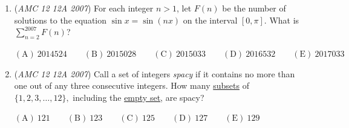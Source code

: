 \begin{enumerate}
	\item (\textit{AMC 12 12A 2007}) For each integer $n>1$, let $F(n)$ be the number of solutions to the equation $\sin{x}=\sin{(nx)}$ on the interval $[0,\pi]$. What is $\sum_{n=2}^{2007} F(n)$?


 $\mathrm{(A)}\ 2014524 \qquad \mathrm{(B)}\ 2015028 \qquad \mathrm{(C)}\ 2015033 \qquad \mathrm{(D)}\ 2016532 \qquad \mathrm{(E)}\ 2017033$


	\item (\textit{AMC 12 12A 2007}) Call a set of integers \textit{spacy} if it contains no more than one out of any three consecutive integers. How many \href{https://artofproblemsolving.com/wiki/index.php?title=Subset}{subsets} of $\{1,2,3,\ldots,12\},$ including the \href{https://artofproblemsolving.com/wiki/index.php?title=Empty\_set}{empty set}, are spacy?


 $\mathrm{(A)}\ 121 \qquad \mathrm{(B)}\ 123 \qquad \mathrm{(C)}\ 125 \qquad \mathrm{(D)}\ 127 \qquad \mathrm{(E)}\ 129$


\end{enumerate}